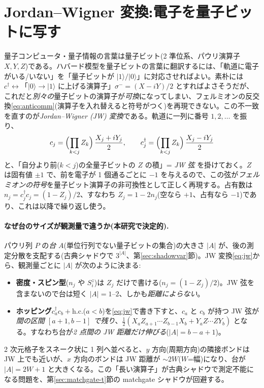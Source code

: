 \documentclass[11pt,a4paper]{ltjsarticle}
\newcommand{\ket}[1]{|#1\rangle}
\newcommand{\cd}{c^\dagger}
\begin{document}
\section{Jordan--Wigner 変換:電子を量子ビットに写す}
\label{sec:jw}

量子コンピュータ・量子情報の言葉は量子ビット(2 準位系、パウリ演算子 $X,Y,Z$)である。ハバード模型を量子ビットの言葉に翻訳するには、「軌道に電子がいる/いない」を「量子ビットが $\ket1/\ket0$」に対応させればよい。素朴には $\cd\leftrightarrow$「$\ket0\to\ket1$ に上げる演算子」$\sigma^-=(X-iY)/2$ とすればよさそうだが、これだと\emph{別々の}量子ビットの演算子が\emph{可換}になってしまい、フェルミオンの反交換\eqref{eq:anticomm}(演算子を入れ替えると符号がつく)を再現できない。この不一致を直すのが\emph{Jordan--Wigner (JW) 変換}である。軌道に一列に番号 $1,2,\dots$ を振り、
\begin{equation}
  c_j = \Bigl(\prod_{k<j} Z_k\Bigr)\,\frac{X_j+iY_j}{2},\qquad
  \cd_j = \Bigl(\prod_{k<j} Z_k\Bigr)\,\frac{X_j-iY_j}{2}
  \label{eq:jw}
\end{equation}
と、「自分より前($k<j$)の全量子ビットの $Z$ の積」= \emph{JW 弦} を掛けておく。$Z$ は固有値 $\pm1$ で、前を電子が 1 個通るごとに $-1$ を与えるので、この弦が\emph{フェルミオンの符号}を量子ビット演算子の非可換性として正しく再現する。占有数は $n_j=\cd_j c_j=(1-Z_j)/2$、すなわち $Z_j=1-2n_j$(空なら $+1$、占有なら $-1$)であり、これは以降で繰り返し使う。

\paragraph{なぜ台のサイズが観測量で違うか(本研究で決定的).}パウリ列 $P$ の\emph{台} $A$(単位行列でない量子ビットの集合)の大きさ $|A|$ が、後の測定分散を支配する(古典シャドウで $3^{|A|}$、第\ref{sec:shadowvar}節)。JW 変換\eqref{eq:jw}から、観測量ごとに $|A|$ が次のように決まる:
\begin{itemize}
  \item \textbf{密度・スピン型}($n_j$ や $S^z_i$)は $Z_j$ だけで書ける($n_j=(1-Z_j)/2$)。JW 弦を含まないので台は短く $|A|=1$--$2$、しかも\emph{距離によらない}。
  \item \textbf{ホッピング}$\cd_a c_b+\text{h.c.}$($a<b$)を\eqref{eq:jw}で書き下すと、$c_a$ と $c_b$ が持つ JW 弦が\emph{間の区間 $[a{+}1,b{-}1]$ で残り}、$\tfrac12(X_a Z_{a+1}\cdots Z_{b-1}X_b + Y_a Z\cdots Z Y_b)$ となる。すなわち台が\emph{2 点間の JW 距離だけ伸びる}($|A|=b-a+1$)。
\end{itemize}
2 次元格子をスネーク状に 1 列へ並べると、$y$ 方向(周期方向)の隣接ボンドは JW 上でも近いが、$x$ 方向のボンドは JW 距離が $\sim2W$($W$=幅)になり、台が $|A|=2W+1$ と大きくなる。この「長い演算子」が古典シャドウで測定不能になる問題を、第\ref{sec:matchgate-t}節の matchgate シャドウが回避する。
\end{document}
